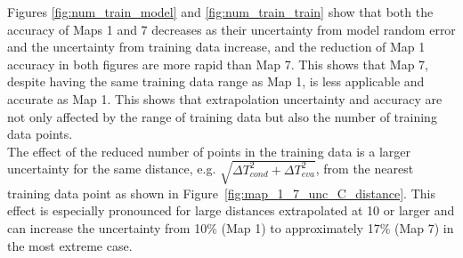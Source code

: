Figures \ref{fig:num_train_model} and \ref{fig:num_train_train} show that both the accuracy of Maps 1 and 7 decreases as their uncertainty from model random error and the uncertainty from training data increase, and the reduction of Map 1 accuracy in both figures are more rapid than Map 7. This shows that Map 7, despite having the same training data range as Map 1, is less applicable and accurate as Map 1. This shows that extrapolation uncertainty and accuracy are not only affected by the range of training data but also the number of training data points.\\

The effect of the reduced number of points in the training data is a larger uncertainty for the same distance, e.g. $\sqrt{\Delta T_{cond}^2 + \Delta T_{eva}^2}$, from the nearest training data point as shown in Figure~\ref{fig:map_1_7_unc_C_distance}.  This effect is especially pronounced for large distances extrapolated at 10\dgC{} or larger and can increase the uncertainty from 10\% (Map 1) to approximately 17\% (Map 7) in the most extreme case.

